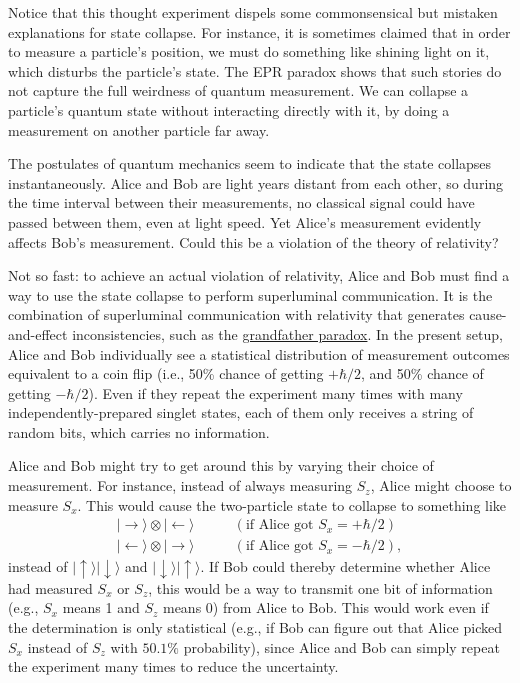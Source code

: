 \documentclass[prx,12pt]{revtex4-2}
\begin{document}
Notice that this thought experiment dispels some commonsensical but
mistaken explanations for state collapse.  For instance, it is
sometimes claimed that in order to measure a particle's position, we
must do something like shining light on it, which disturbs the
particle's state.  The EPR paradox shows that such stories do not
capture the full weirdness of quantum measurement.  We can collapse a
particle's quantum state without interacting directly with it, by
doing a measurement on another particle far away.

The postulates of quantum mechanics seem to indicate that the state
collapses instantaneously.  Alice and Bob are light years distant from
each other, so during the time interval between their measurements, no
classical signal could have passed between them, even at light speed.
Yet Alice's measurement evidently affects Bob's measurement.  Could
this be a violation of the theory of relativity?

Not so fast: to achieve an actual violation of relativity, Alice and
Bob must find a way to use the state collapse to perform superluminal
communication.  It is the combination of superluminal communication
with relativity that generates cause-and-effect inconsistencies, such
as the
\href{https://en.wikipedia.org/wiki/Temporal_paradox#Grandfather_paradox}{grandfather
  paradox}.  In the present setup, Alice and Bob individually see a
statistical distribution of measurement outcomes equivalent to a coin
flip (i.e., 50\% chance of getting $+\hbar/2$, and 50\% chance of
getting $-\hbar/2$).  Even if they repeat the experiment many times
with many independently-prepared singlet states, each of them only
receives a string of random bits, which carries no information.

Alice and Bob might try to get around this by varying their choice of
measurement.  For instance, instead of always measuring $S_z$, Alice
might choose to measure $S_x$.  This would cause the two-particle
state to collapse to something like
\begin{align*}
  |\!\rightarrow\rangle \otimes |\!\leftarrow\rangle &\qquad(\textrm{if Alice got $S_x = +\hbar/2$}) \\
  |\!\leftarrow\rangle \otimes |\!\rightarrow\rangle &\qquad(\textrm{if Alice got $S_x = -\hbar/2$}),
\end{align*}
instead of $|\!\uparrow\rangle |\!\downarrow\rangle$ and
$|\!\downarrow\rangle |\!\uparrow\rangle$.  If Bob could thereby
determine whether Alice had measured $S_x$ or $S_z$, this would be a
way to transmit one bit of information (e.g., $S_x$ means 1 and $S_z$
means 0) from Alice to Bob.  This would work even if the determination
is only statistical (e.g., if Bob can figure out that Alice picked
$S_x$ instead of $S_z$ with $50.1\%$ probability), since Alice and Bob
can simply repeat the experiment many times to reduce the uncertainty.
\end{document}
